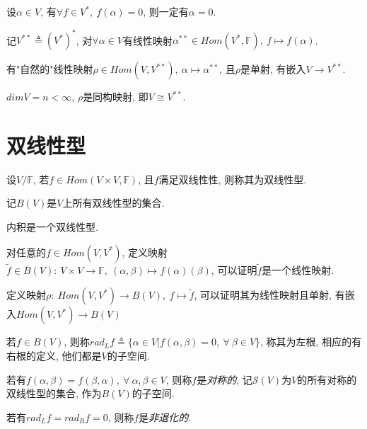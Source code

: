 \begin{statement}
    设$\alpha \in V$, 有$\forall f \in V^*,\ f(\alpha)=0$, 则一定有$\alpha = 0$.
\end{statement}

\begin{example}
    记$V^{**}\triangleq(V^*)^*$, 对$\forall \alpha \in V$有线性映射$\alpha{^{**}}\in Hom(V^*, \mathbb{F}),\ f\mapsto f(\alpha)$.\par
    有"自然的"线性映射$\rho \in Hom(V, V^{**}),\ \alpha \mapsto \alpha{^{**}}$, 且$\rho$是单射, 有嵌入$V\to V^{**}$.
\end{example}

\begin{theorem}[对偶定理]
    $dimV=n<\infty$, $\rho$是同构映射, 即$V\cong V^{**}$.
\end{theorem}

\section{ 双线性型 }

\begin{definition}[双线性型]
    设$V/\mathbb{F}$, 若$f\in Hom(V\times V, \mathbb{F})$, 且$f$满足双线性性, 则称其为双线性型.\par
    记$B(V)$是$V$上所有双线性型的集合.
\end{definition}

\begin{example}
    内积是一个双线性型.
\end{example}

\begin{example}
    对任意的$f\in Hom(V, V^*)$, 定义映射$\tilde{f}\in B(V):\ V\times V\to \mathbb{F},\ (\alpha, \beta)\mapsto f(\alpha)(\beta)$, 可以证明$\tilde{f}$是一个线性映射.\par
    定义映射$\rho:\ Hom(V, V^*)\to B(V),\ f\mapsto \tilde{f}$, 可以证明其为线性映射且单射, 有嵌入$Hom(V,V^*) \to B(V)$
\end{example}

\begin{definition}[左右根]
    若$f\in B(V)$, 则称$rad_Lf\triangleq\{\alpha\in V|f(\alpha, \beta)=0,\ \forall\ \beta \in V\}$, 称其为左根, 相应的有右根的定义, 他们都是$V$的子空间.\par
    若有$f(\alpha, \beta)=f(\beta, \alpha),\ \forall\ \alpha, \beta \in V$, 则称$f$是\emph{对称的}, 记$\mathscr{S}(V)$为$V$的所有对称的双线性型的集合, 作为$B(V)$的子空间.\par
    若有$rad_Lf=rad_Rf=0$, 则称$f$是\emph{非退化的}.
\end{definition}

